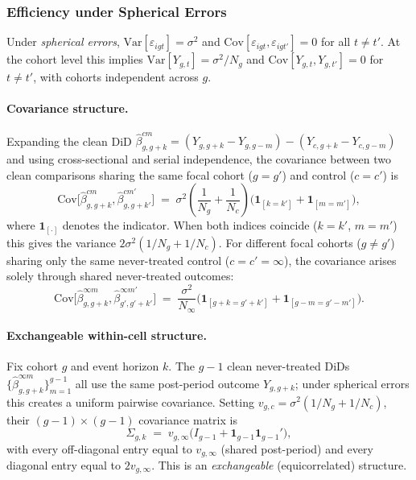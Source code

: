 \documentclass[12pt,letterpaper]{article}
\theoremstyle{remark}
\theoremstyle{definition}
\newcommand{\hbeta}{\hat{\beta}}
\begin{document}
\subsubsection{Efficiency under Spherical Errors}
\label{sec:gmm_spherical}

Under \emph{spherical errors}, $\mathrm{Var}[\varepsilon_{igt}]=\sigma^2$
and $\mathrm{Cov}[\varepsilon_{igt},\varepsilon_{igt'}]=0$ for all $t\neq t'$.
At the cohort level this implies $\mathrm{Var}[Y_{g,t}]=\sigma^2/N_g$ and
$\mathrm{Cov}[Y_{g,t},Y_{g,t'}]=0$ for $t\neq t'$, with cohorts independent
across $g$.

\paragraph{Covariance structure.}
Expanding the clean DiD $\hbeta^{cm}_{g,g+k}=(Y_{g,g+k}-Y_{g,g-m})-(Y_{c,g+k}-Y_{c,g-m})$
and using cross-sectional and serial independence, the covariance between two
clean comparisons sharing the same focal cohort ($g=g'$) and control ($c=c'$)
is
\begin{equation}
  \mathrm{Cov}\!\bigl[\hbeta^{cm}_{g,g+k},\hbeta^{cm'}_{g,g+k'}\bigr]
  \;=\;
  \sigma^2\!\left(\frac{1}{N_g}+\frac{1}{N_c}\right)
  \!\bigl(\mathbf{1}_{[k=k']}+\mathbf{1}_{[m=m']}\bigr),
  \label{eq:cov_sph}
\end{equation}
where $\mathbf{1}_{[\cdot]}$ denotes the indicator. When both indices coincide
($k=k'$, $m=m'$) this gives the variance $2\sigma^2(1/N_g+1/N_c)$.  For
different focal cohorts ($g\neq g'$) sharing only the same never-treated
control ($c=c'=\infty$), the covariance arises solely through shared
never-treated outcomes:
\begin{equation}
  \mathrm{Cov}\!\bigl[\hbeta^{\infty m}_{g,g+k},\hbeta^{\infty m'}_{g',g'+k'}\bigr]
  \;=\;
  \frac{\sigma^2}{N_\infty}
  \bigl(\mathbf{1}_{[g+k=g'+k']}+\mathbf{1}_{[g-m=g'-m']}\bigr).
  \label{eq:cov_sph_cross}
\end{equation}

\paragraph{Exchangeable within-cell structure.}
Fix cohort $g$ and event horizon $k$. The $g-1$ clean never-treated DiDs
$\{\hbeta^{\infty m}_{g,g+k}\}_{m=1}^{g-1}$ all use the same post-period
outcome $Y_{g,g+k}$; under spherical errors this creates a uniform pairwise
covariance. Setting $v_{g,c}=\sigma^2(1/N_g+1/N_c)$, their
$(g-1)\times(g-1)$ covariance matrix is
\begin{equation}
  \Sigma_{g,k}
  \;=\;
  v_{g,\infty}\bigl(I_{g-1}+\mathbf{1}_{g-1}\mathbf{1}_{g-1}'\bigr),
  \label{eq:sigma_block}
\end{equation}
with every off-diagonal entry equal to $v_{g,\infty}$ (shared post-period)
and every diagonal entry equal to $2v_{g,\infty}$. This is an
\emph{exchangeable} (equicorrelated) structure.
\end{document}
